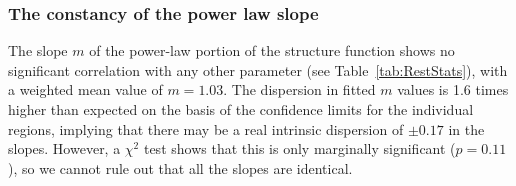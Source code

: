 \documentclass[fleqn,usenatbib, useAMS, a4paper]{mnras}
\newcounter{ionstage}
\renewcommand{\ion}[2]{\setcounter{ionstage}{#2}%
  \ensuremath{\mathrm{#1\,\scriptstyle\Roman{ionstage}}}}
\newcommand\hii{\ion{H}{2}}
\begin{document}




\subsubsection{The constancy of the power law slope}
\label{sec:constancy-power-law}
The slope \(m\) of the power-law portion of the structure function
shows no significant correlation with any other parameter
(see Table~\ref{tab:RestStats}),
with a weighted mean value of \(m = 1.03\).
The dispersion in fitted \(m\) values is 1.6 times higher than expected
on the basis of the confidence limits for the individual regions,
implying that there may be a real intrinsic dispersion of \(\pm 0.17\) in the slopes.
However, a \(\chi^2\) test shows that this is only marginally significant
(\(p = 0.11\)), so we cannot rule out that all the slopes are identical.
\end{document}
